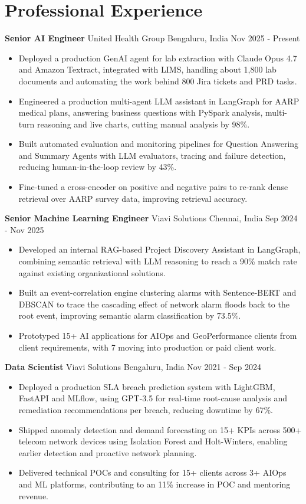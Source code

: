 \documentclass[10pt,a4paper]{article}
\newcommand{\role}[4]{\textbf{#1} \textbar{} #2 \hfill #3 \textbar{} #4\par}
\begin{document}
\section{Professional Experience}
\role{Senior AI Engineer}{United Health Group}{Bengaluru, India}{Nov 2025 - Present}
\begin{itemize}
  \item Deployed a production GenAI agent for lab extraction with Claude Opus 4.7 and Amazon Textract, integrated with LIMS, handling about 1,800 lab documents and automating the work behind 800 Jira tickets and PRD tasks.
  \item Engineered a production multi-agent LLM assistant in LangGraph for AARP medical plans, answering business questions with PySpark analysis, multi-turn reasoning and live charts, cutting manual analysis by 98\%.
  \item Built automated evaluation and monitoring pipelines for Question Answering and Summary Agents with LLM evaluators, tracing and failure detection, reducing human-in-the-loop review by 43\%.
  \item Fine-tuned a cross-encoder on positive and negative pairs to re-rank dense retrieval over AARP survey data, improving retrieval accuracy.
\end{itemize}
\vspace{3pt}
\role{Senior Machine Learning Engineer}{Viavi Solutions}{Chennai, India}{Sep 2024 - Nov 2025}
\begin{itemize}
  \item Developed an internal RAG-based Project Discovery Assistant in LangGraph, combining semantic retrieval with LLM reasoning to reach a 90\% match rate against existing organizational solutions.
  \item Built an event-correlation engine clustering alarms with Sentence-BERT and DBSCAN to trace the cascading effect of network alarm floods back to the root event, improving semantic alarm classification by 73.5\%.
  \item Prototyped 15+ AI applications for AIOps and GeoPerformance clients from client requirements, with 7 moving into production or paid client work.
\end{itemize}
\vspace{3pt}
\role{Data Scientist}{Viavi Solutions}{Bengaluru, India}{Nov 2021 - Sep 2024}
\begin{itemize}
  \item Deployed a production SLA breach prediction system with LightGBM, FastAPI and MLflow, using GPT-3.5 for real-time root-cause analysis and remediation recommendations per breach, reducing downtime by 67\%.
  \item Shipped anomaly detection and demand forecasting on 15+ KPIs across 500+ telecom network devices using Isolation Forest and Holt-Winters, enabling earlier detection and proactive network planning.
  \item Delivered technical POCs and consulting for 15+ clients across 3+ AIOps and ML platforms, contributing to an 11\% increase in POC and mentoring revenue.
\end{itemize}
\end{document}
